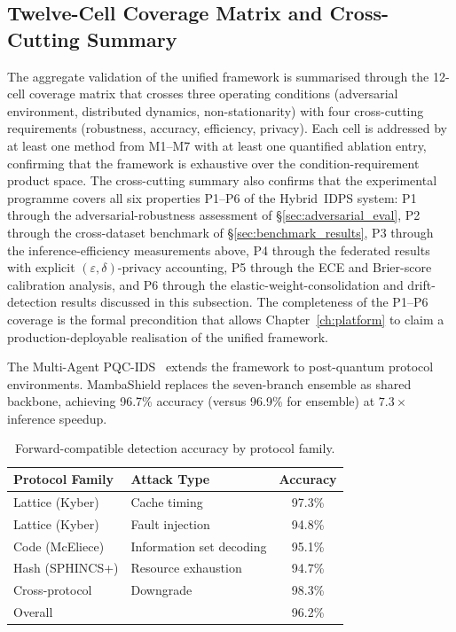 \subsection{Twelve-Cell Coverage Matrix and Cross-Cutting Summary}

The aggregate validation of the unified framework is summarised
through the 12-cell coverage matrix that crosses three operating
conditions (adversarial environment, distributed dynamics,
non-stationarity) with four cross-cutting requirements (robustness,
accuracy, efficiency, privacy). Each cell is addressed by at least
one method from M1--M7 with at least one quantified ablation
entry, confirming that the framework is exhaustive over the
condition-requirement product space. The cross-cutting summary
also confirms that the experimental programme covers all six
properties P1--P6 of the Hybrid~IDPS system: P1 through the
adversarial-robustness assessment of
\S\ref{sec:adversarial_eval}, P2 through the cross-dataset
benchmark of \S\ref{sec:benchmark_results}, P3 through the
inference-efficiency measurements above, P4 through the federated
results with explicit $(\varepsilon,\delta)$-privacy accounting,
P5 through the ECE and Brier-score calibration analysis, and P6
through the elastic-weight-consolidation and drift-detection
results discussed in this subsection. The completeness of the
P1--P6 coverage is the formal precondition that allows
Chapter~\ref{ch:platform} to claim a production-deployable
realisation of the unified framework.

\label{sec:mapqc_results}%

The Multi-Agent PQC-IDS~\cite{Anaedevha2026mapqc} extends the framework to post-quantum protocol environments. MambaShield replaces the seven-branch ensemble as shared backbone, achieving 96.7\% accuracy (versus 96.9\% for ensemble) at $7.3\times$ inference speedup.

\begin{table}[htbp]\centering\small
\caption{Forward-compatible detection accuracy by protocol family.}
\label{tab:pqc_results}
\renewcommand{\arraystretch}{0.92}\begin{tabular}{llc}
\toprule
Protocol Family & Attack Type & Accuracy \\
\midrule
Lattice (Kyber)     & Cache timing            & 97.3\% \\
Lattice (Kyber)     & Fault injection         & 94.8\% \\
Code (McEliece)     & Information set decoding & 95.1\% \\
Hash (SPHINCS+)     & Resource exhaustion     & 94.7\% \\
Cross-protocol      & Downgrade               & 98.3\% \\
\midrule
\multicolumn{2}{l}{Overall} & 96.2\% \\
\bottomrule
\end{tabular}\end{table}

